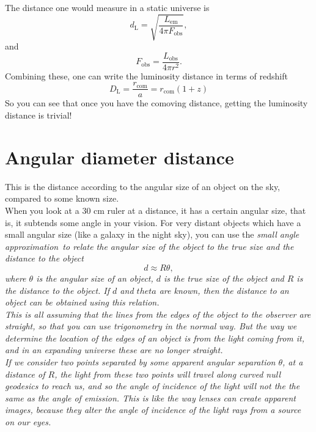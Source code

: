 \documentclass[]{article}
\begin{document}
\noindent The distance one would measure in a static universe is
\begin{equation}
d_\mathrm{L} = \sqrt{\frac{L_\mathrm{em}}{4\pi F_\mathrm{obs}}},
\end{equation}
and 
\begin{equation}
F_\mathrm{obs} = \frac{L_\mathrm{obs}}{4\pi r^2}.
\end{equation}
Combining these, one can write the luminosity distance in terms of redshift
\begin{equation}
\boxed{D_\mathrm{L} = \frac{r_\mathrm{com}}{a} = r_\mathrm{com} (1+z)}
\end{equation}
So you can see that once you have the comoving distance, getting the luminosity distance is trivial!

\section{Angular diameter distance}
This is the distance according to the angular size of an object on the sky, compared to some known size.\\ 

\noindent When you look at a 30 cm ruler at a distance, it has a certain angular size, that is, it subtends some angle in your vision. For very distant objects which have a small angular size (like a galaxy in the night sky), you can use the \itshape small angle approximation~\upshape to relate the angular size of the object to the true size and the distance to the object
\begin{equation}
d \approx R \theta,
\end{equation}
where $\theta$ is the angular size of an object, $d$ is the true size of the object and $R$ is the distance to the object. If $d$ and $theta$ are known, then the distance to an object can be obtained using this relation. \\

\noindent This is all assuming that the lines from the edges of the object to the observer are straight, so that you can use trigonometry in the normal way. But the way we determine the location of the edges of an object is from the light coming from it, and in an expanding universe these are no longer straight. \\

\noindent If we consider two points separated by some apparent angular separation $\theta$, at a distance of $R$, the light from these two points will travel along curved null geodesics to reach us, and so the angle of incidence of the light will not the the same as the angle of emission. This is like the way lenses can create apparent images, because they alter the angle of incidence of the light rays from a source on our eyes. \\
\end{document}
